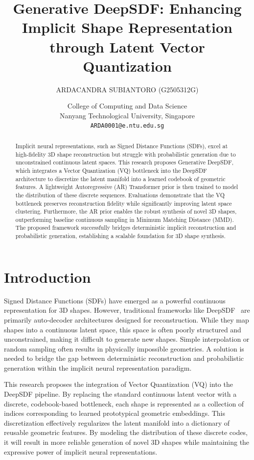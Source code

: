 \documentclass[11pt, a4paper]{article}
\title{Generative DeepSDF: Enhancing Implicit Shape Representation through Latent Vector Quantization}
\author{
    ARDACANDRA SUBIANTORO (G2505312G)
    \and   
    College of Computing and Data Science \\
    Nanyang Technological University, Singapore \\
    \texttt{ARDA0001@e.ntu.edu.sg}
}
\date{}
\begin{document}
\maketitle

\begin{abstract}
Implicit neural representations, such as Signed Distance Functions (SDFs), excel at high-fidelity 3D shape reconstruction but struggle with probabilistic generation due to unconstrained continuous latent spaces. This research proposes Generative DeepSDF, which integrates a Vector Quantization (VQ) bottleneck into the DeepSDF architecture to discretize the latent manifold into a learned codebook of geometric features. A lightweight Autoregressive (AR) Transformer prior is then trained to model the distribution of these discrete sequences. Evaluations demonstrate that the VQ bottleneck preserves reconstruction fidelity while significantly improving latent space clustering. Furthermore, the AR prior enables the robust synthesis of novel 3D shapes, outperforming baseline continuous sampling in Minimum Matching Distance (MMD). The proposed framework successfully bridges deterministic implicit reconstruction and probabilistic generation, establishing a scalable foundation for 3D shape synthesis.
\end{abstract}


\section{Introduction}
Signed Distance Functions (SDFs) have emerged as a powerful continuous representation for 3D shapes. However, traditional frameworks like DeepSDF~\cite{Park_2019_CVPR} are primarily auto-decoder architectures designed for reconstruction. While they map shapes into a continuous latent space, this space is often poorly structured and unconstrained, making it difficult to generate new shapes. Simple interpolation or random sampling often results in physically impossible geometries. A solution is needed to bridge the gap between deterministic reconstruction and probabilistic generation within the implicit neural representation paradigm.

This research proposes the integration of Vector Quantization (VQ) into the DeepSDF pipeline. By replacing the standard continuous latent vector with a discrete, codebook-based bottleneck, each shape is represented as a collection of indices corresponding to learned prototypical geometric embeddings. This discretization effectively regularizes the latent manifold into a dictionary of reusable geometric features. By modeling the distribution of these discrete codes, it will result in more reliable generation of novel 3D shapes while maintaining the expressive power of implicit neural representations.
\end{document}
